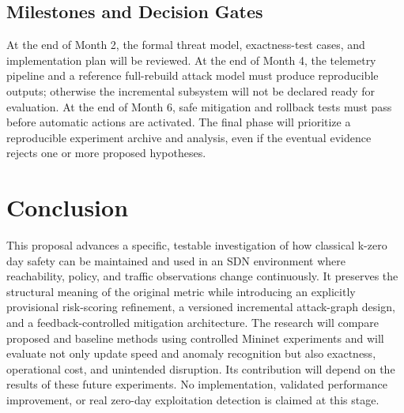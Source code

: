 \documentclass[12pt,a4paper,oneside]{article}
\begin{document}
\subsection{Milestones and Decision Gates}
At the end of Month 2, the formal threat model, exactness-test cases, and implementation plan will be reviewed. At the end of Month 4, the telemetry pipeline and a reference full-rebuild attack model must produce reproducible outputs; otherwise the incremental subsystem will not be declared ready for evaluation. At the end of Month 6, safe mitigation and rollback tests must pass before automatic actions are activated. The final phase will prioritize a reproducible experiment archive and analysis, even if the eventual evidence rejects one or more proposed hypotheses.

\section{Conclusion}\label{sec:conclusion}
This proposal advances a specific, testable investigation of how classical k-zero day safety can be maintained and used in an SDN environment where reachability, policy, and traffic observations change continuously. It preserves the structural meaning of the original metric while introducing an explicitly provisional risk-scoring refinement, a versioned incremental attack-graph design, and a feedback-controlled mitigation architecture. The research will compare proposed and baseline methods using controlled Mininet experiments and will evaluate not only update speed and anomaly recognition but also exactness, operational cost, and unintended disruption. Its contribution will depend on the results of these future experiments. No implementation, validated performance improvement, or real zero-day exploitation detection is claimed at this stage.

\clearpage
{}

\end{document}
